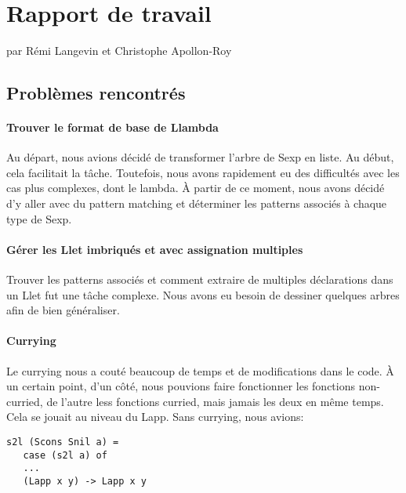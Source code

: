 \section{Rapport de travail}\label{rapport-de-travail}

par Rémi Langevin et Christophe Apollon-Roy

\subsection{Problèmes rencontrés}\label{probluxe8mes-rencontruxe9s}

\paragraph{Trouver le format de base de
Llambda}\label{trouver-le-format-de-base-de-llambda}

Au départ, nous avions décidé de transformer l'arbre de Sexp en liste.
Au début, cela facilitait la tâche. Toutefois, nous avons rapidement eu
des difficultés avec les cas plus complexes, dont le lambda. À partir de
ce moment, nous avons décidé d'y aller avec du pattern matching et
déterminer les patterns associés à chaque type de Sexp.

\paragraph{Gérer les Llet imbriqués et avec assignation
multiples}\label{guxe9rer-les-llet-imbriquuxe9s-et-avec-assignation-multiples}

Trouver les patterns associés et comment extraire de multiples
déclarations dans un Llet fut une tâche complexe. Nous avons eu besoin
de dessiner quelques arbres afin de bien généraliser.

\paragraph{Currying}\label{currying}

Le currying nous a couté beaucoup de temps et de modifications dans le
code. À un certain point, d'un côté, nous pouvions faire fonctionner les
fonctions non-curried, de l'autre less fonctions curried, mais jamais
les deux en même temps. Cela se jouait au niveau du Lapp. Sans currying,
nous avions:

\begin{verbatim}
s2l (Scons Snil a) =
   case (s2l a) of
   ...
   (Lapp x y) -> Lapp x y
\end{verbatim}

